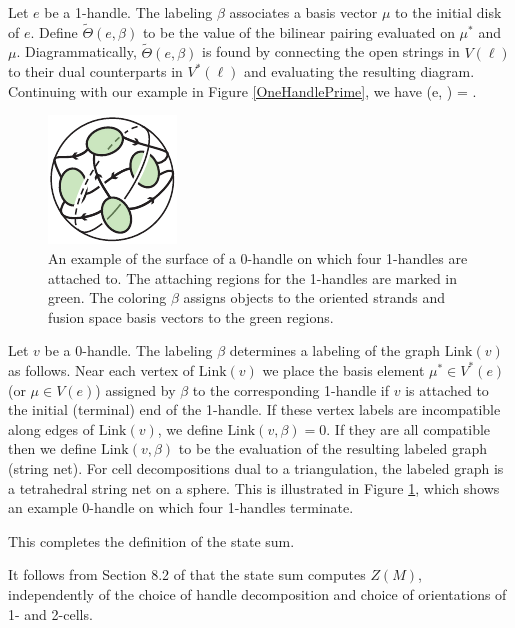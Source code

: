Let $e$ be a 1-handle.
The labeling $\beta$ associates a basis vector $\mu$ to the initial disk of $e$.
Define $\widetilde\Theta(e, \beta)$ to be the value of the bilinear pairing evaluated on $\mu^*$ and $\mu$.
Diagrammatically, $\widetilde\Theta(e, \beta)$ is found by connecting the open strings in $V(\ell)$ to their dual counterparts in $V^*(\ell)$ and evaluating 
the resulting diagram.
Continuing with our example in Figure \ref{OneHandlePrime}, 
we have 
\be \label{four_banana}
\widetilde \Theta (e, \beta) =  \Bananafourmu.
\ee

\begin{figure}
\centering
\includegraphics{TetSphereColored.pdf}
\caption{ \label{TetSphere_Fig} 
An example of the surface of a 0-handle on which four 1-handles are attached to. 
The attaching regions for the 1-handles are marked in green. The coloring $\beta$ assigns 
objects to the oriented strands and fusion space basis vectors to the green regions.
}
\end{figure}

Let $v$ be a 0-handle.
The labeling $\beta$ determines a labeling of the graph $\text{Link}(v)$ as follows.
Near each vertex of $\text{Link}(v)$ we place the basis element $\mu^* \in V^*(e)$ (or $\mu \in V(e)$) assigned by $\beta$ to the 
corresponding 1-handle if $v$ is attached to the initial (terminal) end of the 1-handle.
If these vertex labels are incompatible along edges of $\text{Link}(v)$, we define $\text{Link}(v, \beta) = 0$.
If they are all compatible then we define $\text{Link}(v, \beta)$ to be the evaluation of the resulting labeled graph (string net).
For cell decompositions dual to a triangulation, 
the labeled graph is a tetrahedral string net on a sphere.
This is illustrated in Figure \ref{TetSphere_Fig}, which shows an example 0-handle on which 
four 1-handles terminate. 

This completes the definition of the state sum.

\medskip

It follows from Section 8.2 of \cite{Walker2006} that the state sum computes $Z(M)$, independently of the choice of handle decomposition
and choice of orientations of 1- and 2-cells.

